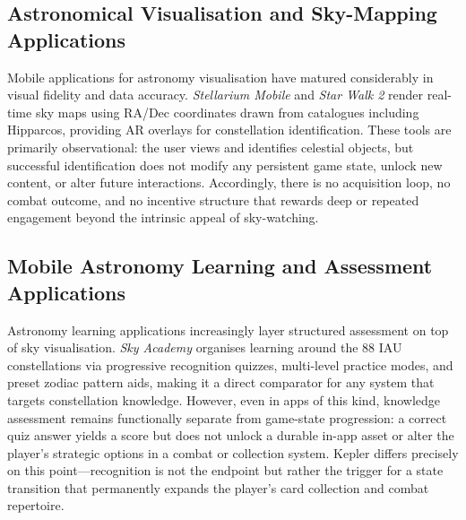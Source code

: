 \documentclass[conference]{IEEEtran}
\begin{document}
\subsection{Astronomical Visualisation and Sky-Mapping Applications}
Mobile applications for astronomy visualisation have matured considerably in visual fidelity and data accuracy. \textit{Stellarium Mobile} \cite{stellarium} and \textit{Star Walk 2} \cite{starwalk2} render real-time sky maps using RA/Dec coordinates drawn from catalogues including Hipparcos, providing AR overlays for constellation identification. These tools are primarily observational: the user views and identifies celestial objects, but successful identification does not modify any persistent game state, unlock new content, or alter future interactions. Accordingly, there is no acquisition loop, no combat outcome, and no incentive structure that rewards deep or repeated engagement beyond the intrinsic appeal of sky-watching.

\subsection{Mobile Astronomy Learning and Assessment Applications}
Astronomy learning applications increasingly layer structured assessment on top of sky visualisation. \textit{Sky Academy} \cite{skyacademy} organises learning around the 88 IAU constellations via progressive recognition quizzes, multi-level practice modes, and preset zodiac pattern aids, making it a direct comparator for any system that targets constellation knowledge. However, even in apps of this kind, knowledge assessment remains functionally separate from game-state progression: a correct quiz answer yields a score but does not unlock a durable in-app asset or alter the player's strategic options in a combat or collection system. Kepler differs precisely on this point---recognition is not the endpoint but rather the trigger for a state transition that permanently expands the player's card collection and combat repertoire.
\end{document}
